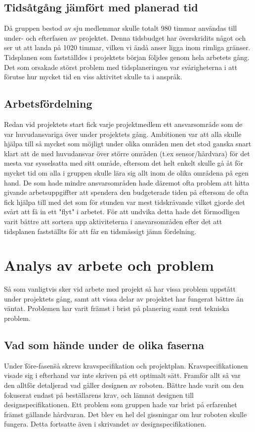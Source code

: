\documentclass[a4paper,12pt]{article}
\begin{document}
\subsection{Tidsåtgång jämfört med planerad tid}
Då gruppen bestod av sju medlemmar skulle totalt 980 timmar användas till under- och efterfasen av projektet. Denna tidsbudget har överskridits något och ser ut att landa på 1020 timmar, vilken vi ändå anser ligga inom rimliga gränser. Tidsplanen som fastställdes i projektets början följdes genom hela arbetets gång. Det som orsakade störst problem med tidsplaneringen var svårigheterna i att förutse hur mycket tid en viss aktivitet skulle ta i anspråk.
\subsection{Arbetsfördelning}
Redan vid projektets start fick varje projektmedlem ett ansvarsområde som de var huvudansvariga över under projektets gång. Ambitionen var att alla skulle hjälpa till så mycket som möjligt under olika områden men det stod ganska snart klart att de med huvudansvar över större områden (t.ex sensor/hårdvara) för det mesta var sysselsatta med sitt område, eftersom det helt enkelt skulle gå åt för mycket tid om alla i gruppen skulle lära sig allt inom de olika områdena på egen hand. De som hade mindre ansvarsområden hade däremot ofta problem att hitta givande arbetsuppgiffter att spendera den budgeterade tiden på eftersom de ofta fick hjälpa till med det som för stunden var mest tidskrävande vilket gjorde det svårt att få in ett "flyt" i arbetet.
För att undvika detta hade det förmodligen varit bättre att sortera upp aktiviteterna i ansvarsområden efter det att tidsplanen fastställts för att får en tidsmässigt jämn fördelning.

\section{Analys av arbete och problem}
Så som vanligtvis sker vid arbete med projekt så har vissa problem uppstått under projektets gång, samt att vissa delar av projektet har fungerat
bättre än väntat. Problemen har varit främst i brist på planering samt rent tekniska problem. 

\subsection{Vad som hände under de olika faserna}
 Under \"före-fasen\" så skrevs kravspecifikation och projektplan. Kravspecifikationen visade sig i efterhand var inte skriven på ett optimalt sätt. 
Framför allt så var den alltför detaljerad vad gäller designen av roboten. Bättre hade varit om den fokuserat endast på beställarens krav, och 
lämnat designen till designspecifikationen. Ett problem som gruppen hade var brist på erfarenhet främst gällande hårdvaran. Det blev en hel 
del gissningar om hur roboten skulle fungera. Detta fortsatte även i skrivandet av designspecifikationen. 
\end{document}
